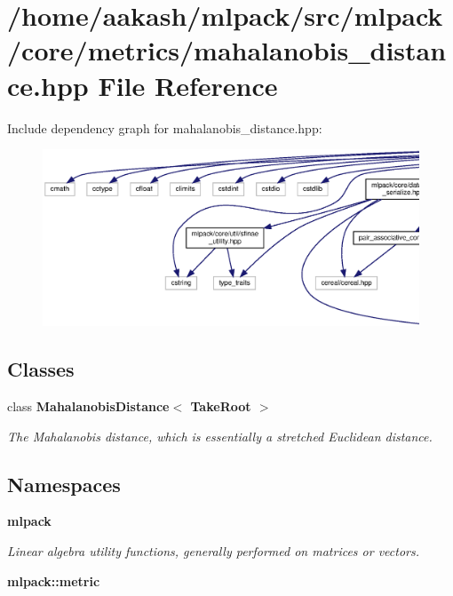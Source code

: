 \section{/home/aakash/mlpack/src/mlpack/core/metrics/mahalanobis\+\_\+distance.hpp File Reference}
\label{mahalanobis__distance_8hpp}
Include dependency graph for mahalanobis\+\_\+distance.\+hpp\+:
\nopagebreak
\begin{figure}[H]
\begin{center}
\leavevmode
\includegraphics[width=350pt]{mahalanobis__distance_8hpp__incl}
\end{center}
\end{figure}
\subsection*{Classes}
\begin{DoxyCompactItemize}
\item 
class \textbf{ Mahalanobis\+Distance$<$ Take\+Root $>$}
\begin{DoxyCompactList}\small\item\em The Mahalanobis distance, which is essentially a stretched Euclidean distance. \end{DoxyCompactList}\end{DoxyCompactItemize}
\subsection*{Namespaces}
\begin{DoxyCompactItemize}
\item 
 \textbf{ mlpack}
\begin{DoxyCompactList}\small\item\em Linear algebra utility functions, generally performed on matrices or vectors. \end{DoxyCompactList}\item 
 \textbf{ mlpack\+::metric}
\end{DoxyCompactItemize}


